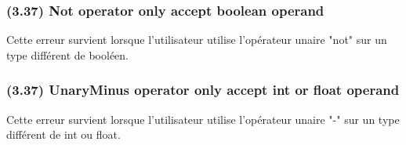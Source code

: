 \documentclass[12pt, a4paper, one side]{article}
\begin{document}
\subsubsection{(3.37) Not operator only accept boolean operand}
Cette erreur survient lorsque l'utilisateur utilise l'opérateur unaire "not" sur un type différent de booléen.

\subsubsection{(3.37) UnaryMinus operator only accept int or float operand}
Cette erreur survient lorsque l'utilisateur utilise l'opérateur unaire "-" sur un type différent de int ou float.
\end{document}
